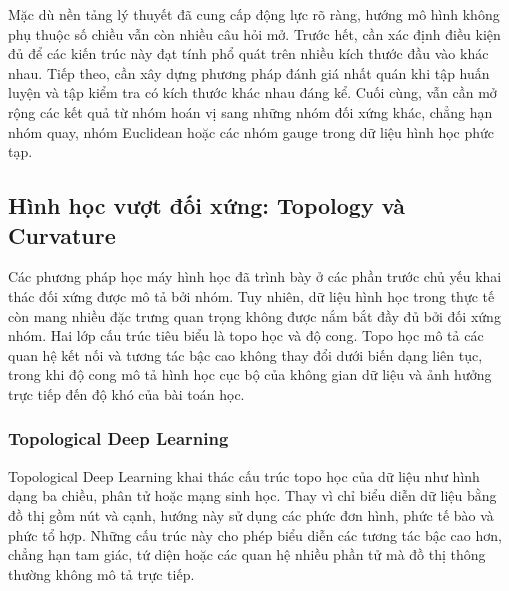 Mặc dù nền tảng lý thuyết đã cung cấp động lực rõ ràng, hướng mô hình không phụ thuộc số chiều vẫn còn nhiều câu hỏi mở. Trước hết, cần xác định điều kiện đủ để các kiến trúc này đạt tính phổ quát trên nhiều kích thước đầu vào khác nhau. Tiếp theo, cần xây dựng phương pháp đánh giá nhất quán khi tập huấn luyện và tập kiểm tra có kích thước khác nhau đáng kể. Cuối cùng, vẫn cần mở rộng các kết quả từ nhóm hoán vị sang những nhóm đối xứng khác, chẳng hạn nhóm quay, nhóm Euclidean hoặc các nhóm gauge trong dữ liệu hình học phức tạp.


\subsection{Hình học vượt đối xứng: Topology và Curvature}
\label{subsec:beyond-symmetry}


Các phương pháp học máy hình học đã trình bày ở các phần trước chủ yếu khai thác đối xứng được mô tả bởi nhóm. Tuy nhiên, dữ liệu hình học trong thực tế còn mang nhiều đặc trưng quan trọng không được nắm bắt đầy đủ bởi đối xứng nhóm. Hai lớp cấu trúc tiêu biểu là topo học và độ cong. Topo học mô tả các quan hệ kết nối và tương tác bậc cao không thay đổi dưới biến dạng liên tục, trong khi độ cong mô tả hình học cục bộ của không gian dữ liệu và ảnh hưởng trực tiếp đến độ khó của bài toán học.

\subsubsection{Topological Deep Learning}

Topological Deep Learning khai thác cấu trúc topo học của dữ liệu như hình dạng ba chiều, phân tử hoặc mạng sinh học. Thay vì chỉ biểu diễn dữ liệu bằng đồ thị gồm nút và cạnh, hướng này sử dụng các phức đơn hình, phức tế bào và phức tổ hợp. Những cấu trúc này cho phép biểu diễn các tương tác bậc cao hơn, chẳng hạn tam giác, tứ diện hoặc các quan hệ nhiều phần tử mà đồ thị thông thường không mô tả trực tiếp.

